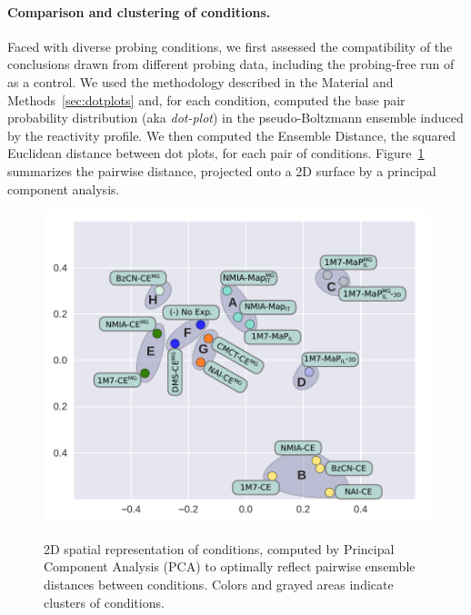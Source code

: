 \documentclass[a4,center,fleqn]{NAR}
\begin{document}
\paragraph{Comparison and clustering of conditions.}
Faced with diverse probing conditions, we first assessed the compatibility of the conclusions drawn from different probing data, including the probing-free run of \OurTool as a control. We used the methodology described in the Material and Methods~\ref{sec:dotplots} and, for each condition, computed the base pair probability distribution (aka \emph{dot-plot}) in the  pseudo-Boltzmann ensemble induced by the reactivity profile. We then computed the Ensemble Distance, the squared Euclidean distance between dot plots, for each pair of conditions. Figure~\ref{fig:PCA} summarizes the pairwise distance, projected onto a 2D surface by a principal component analysis.


\begin{figure}
	{\centering \includegraphics[width=\linewidth]{graphs/didy/PCA}\\}%
	
	\caption{2D spatial representation of conditions, computed by Principal Component Analysis (PCA) to optimally reflect pairwise ensemble distances between conditions. Colors and grayed areas indicate clusters of conditions.}\label{fig:PCA}
\end{figure}
\end{document}
